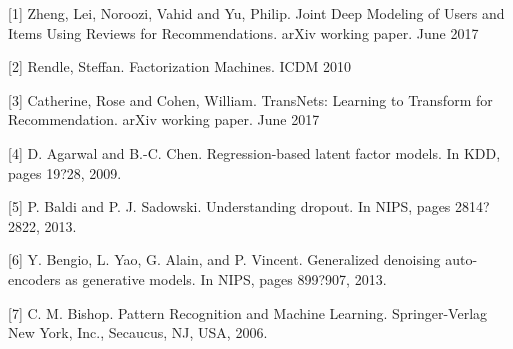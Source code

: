 \documentclass[10pt,twocolumn,letterpaper]{article}
\begin{document}
[1] Zheng, Lei, Noroozi, Vahid and Yu, Philip. Joint Deep Modeling of Users
 and Items Using Reviews for Recommendations. arXiv working paper. June 2017

[2] Rendle, Steffan. Factorization Machines. ICDM 2010

[3] Catherine, Rose and Cohen, William. TransNets: Learning to Transform
for Recommendation. arXiv working paper. June 2017

[4] D. Agarwal and B.-C. Chen. Regression-based latent
factor models. In KDD, pages 19?28, 2009.

[5] P. Baldi and P. J. Sadowski. Understanding dropout.
In NIPS, pages 2814?2822, 2013.

[6] Y. Bengio, L. Yao, G. Alain, and P. Vincent.
Generalized denoising auto-encoders as generative
models. In NIPS, pages 899?907, 2013.

[7] C. M. Bishop. Pattern Recognition and Machine
Learning. Springer-Verlag New York, Inc., Secaucus,
NJ, USA, 2006.
\end{document}
